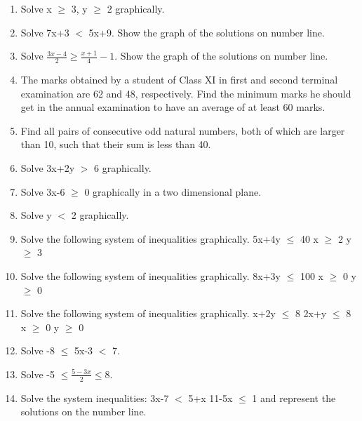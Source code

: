 \renewcommand{\theequation}{\theenumi}
\begin{enumerate}[label=\arabic*.,ref=\thesubsection.\theenumi]

\item Solve  x $\geq$ 3, y $\geq$ 2 graphically.
\\
\solution 


    \item Solve 7x+3 $<$ 5x+9. Show the graph of the solutions on number line.
    \item Solve $\frac{3x-4}{2} \geq \frac{x+1}{4}-1$. Show the graph of the solutions on number line.
\\
\solution 

    \item The marks obtained by a student of Class XI in first and second terminal examination are 62 and 48, respectively. Find the minimum marks he should get in the annual examination to have an average of at least 60 marks.
\\
\solution 

    \item Find all pairs of consecutive odd natural numbers, both of which are larger than 10, such that their sum is less than 40.
    \item Solve 3x+2y $>$ 6 graphically.
\\
\solution 

    \item Solve 3x-6 $\geq$ 0 graphically in a two dimensional plane.
    \item Solve y $<$ 2 graphically.
    \item Solve the following system of inequalities graphically.
     5x+4y $\leq$ 40
     x $\geq$ 2
     y $\geq$ 3
     \item Solve the following system of inequalities graphically.
     8x+3y $\leq$ 100
     x $\geq$ 0
     y $\geq$ 0
     \item Solve the following system of inequalities graphically.
     x+2y $\leq$ 8
     2x+y $\leq$ 8
     x $\geq$ 0
     y $\geq$ 0
     \item Solve -8 $\leq$ 5x-3 $<$ 7.
     \item Solve -5 $\leq \frac{5-3x}{2} \leq 8$.
     \item Solve the system inequalities:
     3x-7 $<$ 5+x
     11-5x $\leq$ 1
     and represent the solutions on the number line.
    

\end{enumerate}
